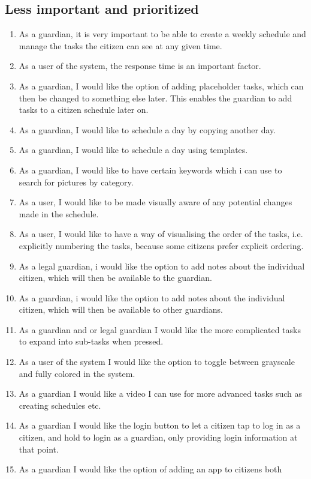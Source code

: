 \subsection{Less important and prioritized}
\begin{enumerate}
  \item As a guardian, it is very important to be able to create a weekly
schedule and manage the tasks the citizen can see at any given time.
  \item As a user of the system, the response time is an important factor.
  \item As a guardian, I would like the option of adding placeholder tasks,
which can then be changed to something else later. This enables the guardian to add tasks to a citizen schedule later on.
  \item As a guardian, I would like to schedule a day by copying another day.
  \item As a guardian, I would like to schedule a day using templates.
  \item As a guardian, I would like to have certain keywords which i can use to
search for pictures by category.
  \item As a user, I would like to be made visually aware of any potential
changes made in the schedule.
  \item As a user, I would like to have a way of visualising the order of the
tasks, i.e. explicitly numbering the tasks, because some citizens prefer explicit ordering.
  \item As a legal guardian, i would like the option to add notes about the
individual citizen, which will then be available to the guardian.
  \item As a guardian, i would like the option to add notes about the individual
citizen, which will then be available to other guardians.
  \item As a guardian and or legal guardian I would like the more complicated
tasks to expand into sub-tasks when pressed.
  \item As a user of the system I would like the option to toggle between
grayscale and fully colored in the system.
  \item As a guardian I would like a video I can use for more advanced tasks
such as creating schedules etc.
  \item As a guardian I would like the login button to let a citizen tap to log
in as a citizen, and hold to login as a guardian, only providing login information at that point.
  \item As a guardian I would like the option of adding an app to citizens both

\end{enumerate}
